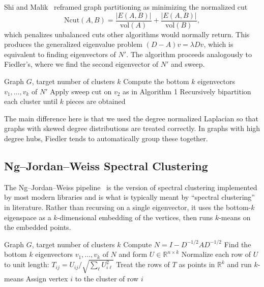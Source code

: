 \documentclass{article}
\theoremstyle{definition}
\theoremstyle{remark}
\begin{document}
Shi and Malik~\cite{shimalik2000} reframed graph partitioning as minimizing the normalized cut
\[
\mathrm{Ncut}(A, B) = \frac{|E(A, B)|}{\mathrm{vol}(A)} + \frac{|E(A, B)|}{\mathrm{vol}(B)},
\]
which penalizes unbalanced cuts other algorithms would normally return. This produces the generalized eigenvalue problem $(D - A) v = \lambda D v$, which is equivalent to finding eigenvectors of $N'$. The algorithm proceeds analogously to Fiedler's, where we find the second eigenvector of $N'$ and sweep.

\begin{algorithm}[H]
\caption{Shi--Malik Normalized Cut}
\begin{algorithmic}[1]
\Require Graph $G$, target number of clusters $k$
\State Compute the bottom $k$ eigenvectors $v_1, \ldots, v_k$ of $N'$
    \State Apply sweep cut on $v_2$ as in Algorithm 1
\Else
    \State Recursively bipartition each cluster until $k$ pieces are obtained
\EndIf
\end{algorithmic}
\end{algorithm}

The main difference here is that we used the degree normalized Laplacian so that graphs with skewed degree distributions are treated correctly. In graphs with high degree hubs, Fiedler tends to automatically group these together.

\subsection{Ng--Jordan--Weiss Spectral Clustering}

The Ng--Jordan--Weiss pipeline~\cite{ng2002spectral} is the version of spectral clustering implemented by most modern libraries and is what is typically meant by ``spectral clustering'' in literature. Rather than recursing on a single eigenvector, it uses the bottom-$k$ eigenspace as a $k$-dimensional embedding of the vertices, then runs $k$-means on the embedded points.

\begin{algorithm}[H]
\caption{Ng--Jordan--Weiss Spectral Clustering}
\begin{algorithmic}[1]
\Require Graph $G$, target number of clusters $k$
\State Compute $N = I - D^{-1/2} A D^{-1/2}$
\State Find the bottom $k$ eigenvectors $v_1, \ldots, v_k$ of $N$ and form $U \in \mathbb{R}^{n \times k}$
\State Normalize each row of $U$ to unit length: $T_{ij} = U_{ij} / \sqrt{\sum_\ell U_{i\ell}^2}$
\State Treat the rows of $T$ as points in $\mathbb{R}^k$ and run $k$-means
\State Assign vertex $i$ to the cluster of row $i$
\end{algorithmic}
\end{algorithm}
\end{document}
